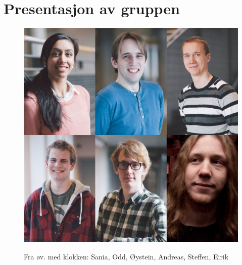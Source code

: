 \documentclass[a4paper,norsk,oneside]{article}
\begin{document}
\section{Presentasjon av gruppen}
\begin{figure}[H]
\centering
\includegraphics[scale=0.25]{figs/gruppebildegeokomai}
\label{gmaps1}
\caption{Fra øv. med klokken: Sania, Odd, Øystein, Andreas, Steffen, Eirik}
\end{figure}
\end{document}
